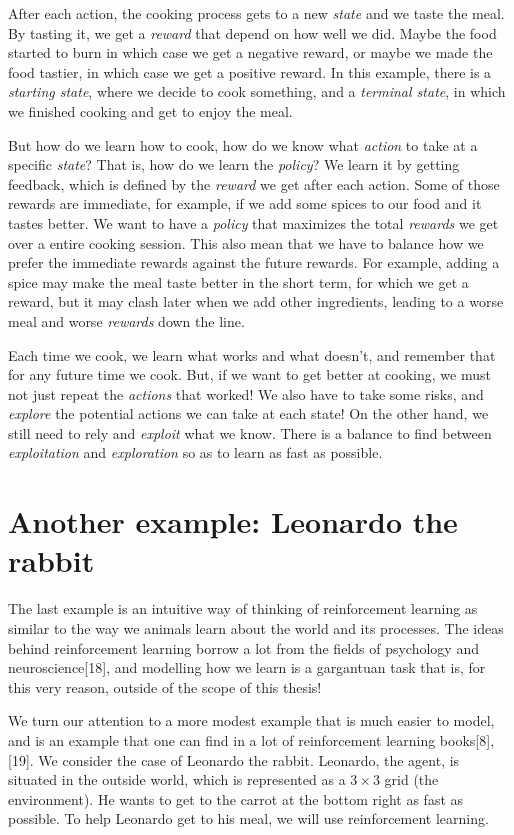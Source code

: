 \documentclass[
  letterpaper,
]{report}
\theoremstyle{definition}
\theoremstyle{plain}
\theoremstyle{definition}
\theoremstyle{remark}
\begin{document}
After each action, the cooking process gets to a new \emph{state} and we
taste the meal. By tasting it, we get a \emph{reward} that depend on how
well we did. Maybe the food started to burn in which case we get a
negative reward, or maybe we made the food tastier, in which case we get
a positive reward. In this example, there is a \emph{starting state},
where we decide to cook something, and a \emph{terminal state}, in which
we finished cooking and get to enjoy the meal.

But how do we learn how to cook, how do we know what \emph{action} to
take at a specific \emph{state}? That is, how do we learn the
\emph{policy}? We learn it by getting feedback, which is defined by the
\emph{reward} we get after each action. Some of those rewards are
immediate, for example, if we add some spices to our food and it tastes
better. We want to have a \emph{policy} that maximizes the total
\emph{rewards} we get over a entire cooking session. This also mean that
we have to balance how we prefer the immediate rewards against the
future rewards. For example, adding a spice may make the meal taste
better in the short term, for which we get a reward, but it may clash
later when we add other ingredients, leading to a worse meal and worse
\emph{rewards} down the line.

Each time we cook, we learn what works and what doesn't, and remember
that for any future time we cook. But, if we want to get better at
cooking, we must not just repeat the \emph{actions} that worked! We also
have to take some risks, and \emph{explore} the potential actions we can
take at each state! On the other hand, we still need to rely and
\emph{exploit} what we know. There is a balance to find between
\emph{exploitation} and \emph{exploration} so as to learn as fast as
possible.

\section{Another example: Leonardo the
rabbit}\label{another-example-leonardo-the-rabbit}

The last example is an intuitive way of thinking of reinforcement
learning as similar to the way we animals learn about the world and its
processes. The ideas behind reinforcement learning borrow a lot from the
fields of psychology and neuroscience{[}18{]}, and modelling how we
learn is a gargantuan task that is, for this very reason, outside of the
scope of this thesis!

We turn our attention to a more modest example that is much easier to
model, and is an example that one can find in a lot of reinforcement
learning books{[}8{]}, {[}19{]}. We consider the case of Leonardo the
rabbit. Leonardo, the agent, is situated in the outside world, which is
represented as a \(3\times 3\) grid (the environment). He wants to get
to the carrot at the bottom right as fast as possible. To help Leonardo
get to his meal, we will use reinforcement learning.
\end{document}

